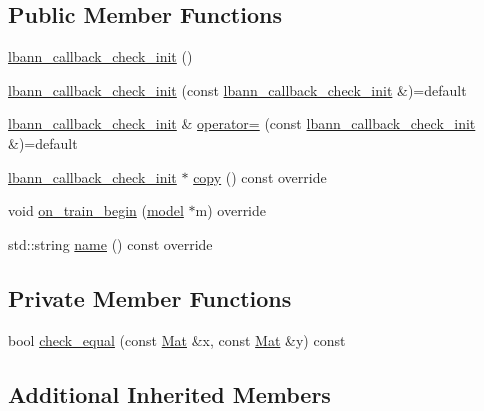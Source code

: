 \subsection*{Public Member Functions}
\begin{DoxyCompactItemize}
\item 
\hyperlink{classlbann_1_1lbann__callback__check__init_a3910da2c4e972567d79e5e414404a3da}{lbann\+\_\+callback\+\_\+check\+\_\+init} ()
\item 
\hyperlink{classlbann_1_1lbann__callback__check__init_a1378d95f56106f6983378aed464c5747}{lbann\+\_\+callback\+\_\+check\+\_\+init} (const \hyperlink{classlbann_1_1lbann__callback__check__init}{lbann\+\_\+callback\+\_\+check\+\_\+init} \&)=default
\item 
\hyperlink{classlbann_1_1lbann__callback__check__init}{lbann\+\_\+callback\+\_\+check\+\_\+init} \& \hyperlink{classlbann_1_1lbann__callback__check__init_a7f656e9810d478eba4bebdd77aa45407}{operator=} (const \hyperlink{classlbann_1_1lbann__callback__check__init}{lbann\+\_\+callback\+\_\+check\+\_\+init} \&)=default
\item 
\hyperlink{classlbann_1_1lbann__callback__check__init}{lbann\+\_\+callback\+\_\+check\+\_\+init} $\ast$ \hyperlink{classlbann_1_1lbann__callback__check__init_aa210192427df3f6aa7e12509e9b57f56}{copy} () const override
\item 
void \hyperlink{classlbann_1_1lbann__callback__check__init_a037f1371c56c1b528f487517a58ce3fb}{on\+\_\+train\+\_\+begin} (\hyperlink{classlbann_1_1model}{model} $\ast$m) override
\item 
std\+::string \hyperlink{classlbann_1_1lbann__callback__check__init_a4f8507c26f8e467697fef29ab8463b0f}{name} () const override
\end{DoxyCompactItemize}
\subsection*{Private Member Functions}
\begin{DoxyCompactItemize}
\item 
bool \hyperlink{classlbann_1_1lbann__callback__check__init_a9a7a7cffe24967aae2b82d1668c2b87c}{check\+\_\+equal} (const \hyperlink{base_8hpp_a68f11fdc31b62516cb310831bbe54d73}{Mat} \&x, const \hyperlink{base_8hpp_a68f11fdc31b62516cb310831bbe54d73}{Mat} \&y) const
\end{DoxyCompactItemize}
\subsection*{Additional Inherited Members}


